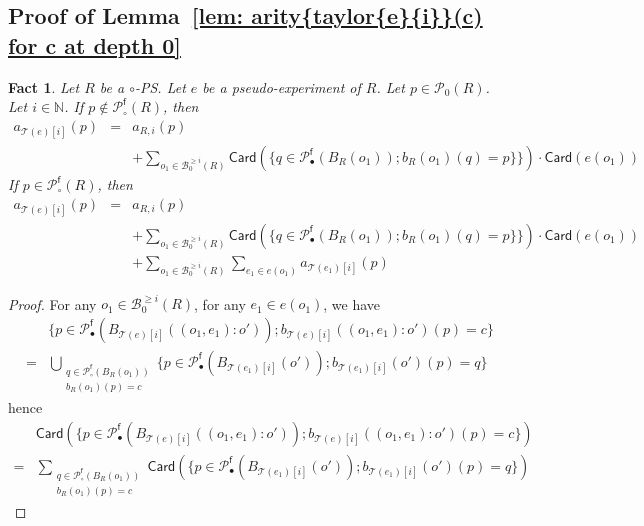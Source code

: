 \documentclass{article}
\theoremstyle{plain}
\newtheorem{fact}[theorem]{Fact}
\newcommand{\Nat}{\ensuremath{\mathbb{N}}}
\newcommand{\taylor}[2]{\mathcal{T}(#1)[#2]}
\newcommand{\portsatzero}[1]{\mathcal{P}_0(#1)}
\newcommand{\arity}[1]{{\textit{a}}_{#1}}
\newcommand{\Card}[1]{\textsf{Card}\left( #1 \right)}
\newcommand{\conclusionscirc}[1]{\mathcal{P}_\circ^{\textsf{f}}(#1)}
\newcommand{\conclusionsnotcirc}[1]{\mathcal{P}_\bullet^{\textsf{f}}(#1)}
\newcommand{\boxesatzerogeq}[2]{\mathcal{B}_0^{\geq #2}(#1)}
\begin{document}
\subsection{Proof of Lemma~\ref{lem: arity{taylor{e}{i}}(c) for c at depth 0}}

\begin{fact}\label{fact: arity}
Let $R$ be a $\circ$-PS. Let $e$ be a pseudo-experiment of $R$. Let $p \in \portsatzero{R}$. Let $i \in \Nat$. 
If $p \notin \conclusionscirc{R}$, then
\begin{eqnarray*}
\arity{\taylor{e}{i}}(p) & = & \arity{R, i}(p) \\
& & + \sum_{o_1 \in \boxesatzerogeq{R}{i}} \Card{\{ q \in \conclusionsnotcirc{B_R(o_1)} ; b_R(o_1)(q) = p \}\}} \cdot \Card{e(o_1)}
\end{eqnarray*}
If $p \in \conclusionscirc{R}$, then
\begin{eqnarray*}
\arity{\taylor{e}{i}}(p) & = & \arity{R, i}(p) \\
& & + \sum_{o_1 \in \boxesatzerogeq{R}{i}} \Card{\{ q \in \conclusionsnotcirc{B_R(o_1)} ; b_R(o_1)(q) = p \}\}} \cdot \Card{e(o_1)}\\
& & + \sum_{o_1 \in \boxesatzerogeq{R}{i}} \sum_{e_1 \in e(o_1)} \arity{\taylor{e_1}{i}}(p)
\end{eqnarray*}
\end{fact}

\begin{proof}
For any $o_1 \in \boxesatzerogeq{R}{i}$, for any $e_1 \in e(o_1)$, we have
\begin{align*}
& \{ p \in \conclusionsnotcirc{B_{\taylor{e}{i}}((o_1, e_1):o')} ; b_{\taylor{e}{i}}((o_1, e_1):o')(p) = c \} \\
= & \bigcup_{\begin{array}{c} q \in \conclusionscirc{B_R(o_1)}\\ b_R(o_1)(p) = c \end{array}} \{ p \in \conclusionsnotcirc{B_{\taylor{e_1}{i}}(o')} ; b_{\taylor{e_1}{i}}(o')(p) = q \}
\end{align*}
hence
\begin{align*}
& \Card{\{ p \in \conclusionsnotcirc{B_{\taylor{e}{i}}((o_1, e_1):o')} ; b_{\taylor{e}{i}}((o_1, e_1):o')(p) = c \}} \\
= & \sum_{\begin{array}{c} q \in \conclusionscirc{B_R(o_1)}\\ b_R(o_1)(p) = c \end{array}} \Card{\{ p \in \conclusionsnotcirc{B_{\taylor{e_1}{i}}(o')} ; b_{\taylor{e_1}{i}}(o')(p) = q \}}
\end{align*}
\end{proof}
\end{document}

